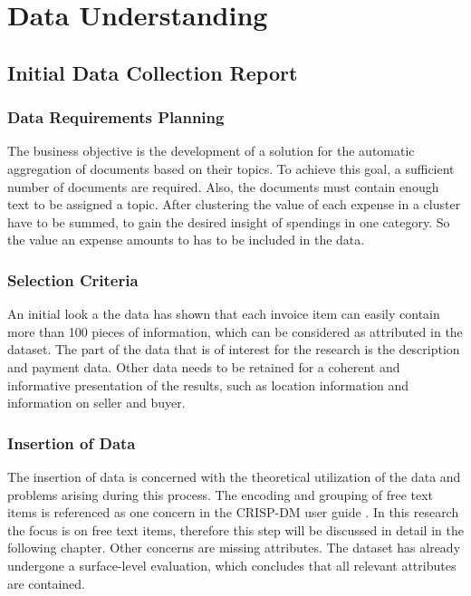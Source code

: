 \chapter{Data Understanding}

\section{Initial Data Collection Report}

\subsection{Data Requirements Planning}
The business objective is the development of a solution for the automatic aggregation of documents based on their topics. To achieve this goal, a sufficient number of documents are required. Also, the documents must contain enough text to be assigned a topic. After clustering the value of each expense in a cluster have to be summed, to gain the desired insight of spendings in one category. So the value an expense amounts to has to be included in the data.

\subsection{Selection Criteria}
An initial look a the data has shown that each invoice item can easily contain more than 100 pieces of information, which can be considered as attributed in the dataset. The part of the data that is of interest for the research is the description and payment data. Other data needs to be retained for a coherent and informative presentation of the results, such as location information and information on seller and buyer.

\subsection{Insertion of Data}

The insertion of data is concerned with the theoretical utilization of the data and problems arising during this process. The encoding and grouping of free text items is referenced as one concern in the \ac{CRISP-DM} user guide \cite{CRISPDM2000}. In this research the focus is on free text items, therefore this step will be discussed in detail in the following chapter. 
Other concerns are missing attributes. The dataset has already undergone a surface-level evaluation, which concludes that all relevant attributes are contained.

